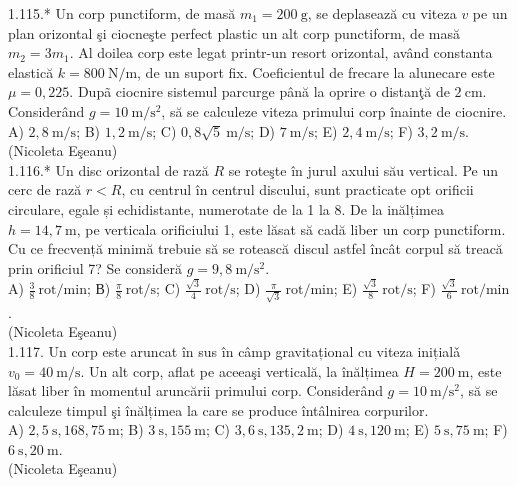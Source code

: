 1.115.* Un corp punctiform, de masă $m_{1}=200 \mathrm{~g}$, se deplasează cu viteza $v$ pe un plan orizontal şi ciocneşte perfect plastic un alt corp punctiform, de masă $m_{2}=3 m_{1}$. Al doilea corp este legat printr-un resort orizontal, având constanta elastică $k=800 \mathrm{~N} / \mathrm{m}$, de un suport fix. Coeficientul de frecare la alunecare este $\mu=0,225$. Dupã ciocnire sistemul parcurge până la oprire o distanţă de $2 \mathrm{~cm}$. Considerând $g=10 \mathrm{~m} / \mathrm{s}^{2}$, să se calculeze viteza primului corp înainte de ciocnire.\\ A) $2,8 \mathrm{~m} / \mathrm{s}$; B) $1,2 \mathrm{~m} / \mathrm{s}$; C) $0,8 \sqrt{5} \mathrm{~m} / \mathrm{s}$; D) $7 \mathrm{~m} / \mathrm{s}$; E) $2,4 \mathrm{~m} / \mathrm{s}$; F) $3,2 \mathrm{~m} / \mathrm{s}$.\\ (Nicoleta Eşeanu)\\

1.116.* Un disc orizontal de rază $R$ se roteşte în jurul axului său vertical. Pe un cerc de rază $r<R$, cu centrul în centrul discului, sunt practicate opt orificii circulare, egale și echidistante, numerotate de la 1 la 8. De la inălțimea $h=14,7 \mathrm{~m}$, pe verticala orificiului 1, este lăsat să cadă liber un corp punctiform. Cu ce frecvență minimă trebuie să se rotească discul astfel încât corpul să treacă prin orificiul 7? Se consideră $g=9,8 \mathrm{~m} / \mathrm{s}^{2}$.\\ A) $\frac{3}{8} \mathrm{~rot} / \mathrm{min}$; В) $\frac{\pi}{8} \mathrm{~rot} / \mathrm{s}$; C) $\frac{\sqrt{3}}{4} \mathrm{~rot} / \mathrm{s}$; D) $\frac{\pi}{\sqrt{3}} \mathrm{~rot} / \mathrm{min}$; E) $\frac{\sqrt{3}}{8} \mathrm{~rot} / \mathrm{s}$; F) $\frac{\sqrt{3}}{6} \mathrm{~rot} / \mathrm{min}$.\\ (Nicoleta Eşeanu)\\

1.117. Un corp este aruncat în sus în câmp gravitațional cu viteza inițialǎ $v_{0}=40 \mathrm{~m} / \mathrm{s}$. Un alt corp, aflat pe aceeaşi verticală, la înălțimea $H=200 \mathrm{~m}$, este lăsat liber în momentul aruncării primului corp. Considerând $g=10 \mathrm{~m} / \mathrm{s}^{2}$, să se calculeze timpul şi înălțimea la care se produce întâlnirea corpurilor.\\ A) $2,5 \mathrm{~s}, 168,75 \mathrm{~m}$; B) $3 \mathrm{~s}, 155 \mathrm{~m}$; C) $3,6 \mathrm{~s}, 135,2 \mathrm{~m}$; D) $4 \mathrm{~s}, 120 \mathrm{~m}$;  E) $5 \mathrm{~s}, 75 \mathrm{~m}$; F) $6 \mathrm{~s}, 20 \mathrm{~m}$.\\ (Nicoleta Eşeanu)\\

